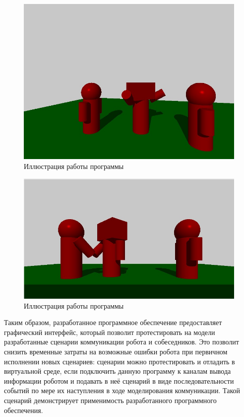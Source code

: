 \begin{figure}[h]
	\centering
	\includegraphics[width=1.0\linewidth]{images/screenshot005}
	\caption{Иллюстрация работы программы}
	\label{fig:screenshot005}
\end{figure}

\begin{figure}[h]
	\centering
	\includegraphics[width=1.0\linewidth]{images/screenshot006}
	\caption{Иллюстрация работы программы}
	\label{fig:screenshot006}
\end{figure}

\clearpage

Таким образом, разработанное программное обеспечение предоставляет графический интерфейс, который позволит протестировать на модели разработанные сценарии коммуникации робота и собеседников. Это позволит снизить временные затраты на возможные ошибки робота при первичном исполнении новых сценариев: сценарии можно протестировать и отладить в виртуальной среде, если подключить данную программу к каналам вывода информации роботом и подавать в неё сценарий в виде последовательности событий по мере их наступления в ходе моделирования коммуникации.
Такой сценарий демонстрирует применимость разработанного программного обеспечения.

